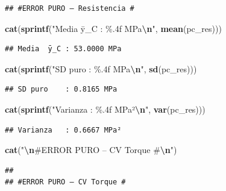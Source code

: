 \documentclass[
]{article}
\newenvironment{Shaded}{\begin{snugshade}}{\end{snugshade}}
\newcommand{\FunctionTok}[1]{\textcolor[rgb]{0.13,0.29,0.53}{\textbf{#1}}}
\newcommand{\NormalTok}[1]{#1}
\newcommand{\SpecialCharTok}[1]{\textcolor[rgb]{0.81,0.36,0.00}{\textbf{#1}}}
\newcommand{\StringTok}[1]{\textcolor[rgb]{0.31,0.60,0.02}{#1}}
\begin{document}
\begin{verbatim}
## #ERROR PURO – Resistencia #
\end{verbatim}

\begin{Shaded}
\begin{Highlighting}[]
\FunctionTok{cat}\NormalTok{(}\FunctionTok{sprintf}\NormalTok{(}\StringTok{"Media  ȳ\_C : \%.4f MPa}\SpecialCharTok{\textbackslash{}n}\StringTok{"}\NormalTok{,  }\FunctionTok{mean}\NormalTok{(pc\_res)))}
\end{Highlighting}
\end{Shaded}

\begin{verbatim}
## Media  ȳ_C : 53.0000 MPa
\end{verbatim}

\begin{Shaded}
\begin{Highlighting}[]
\FunctionTok{cat}\NormalTok{(}\FunctionTok{sprintf}\NormalTok{(}\StringTok{"SD puro    : \%.4f MPa}\SpecialCharTok{\textbackslash{}n}\StringTok{"}\NormalTok{,  }\FunctionTok{sd}\NormalTok{(pc\_res)))}
\end{Highlighting}
\end{Shaded}

\begin{verbatim}
## SD puro    : 0.8165 MPa
\end{verbatim}

\begin{Shaded}
\begin{Highlighting}[]
\FunctionTok{cat}\NormalTok{(}\FunctionTok{sprintf}\NormalTok{(}\StringTok{"Varianza   : \%.4f MPa²}\SpecialCharTok{\textbackslash{}n}\StringTok{"}\NormalTok{, }\FunctionTok{var}\NormalTok{(pc\_res)))}
\end{Highlighting}
\end{Shaded}

\begin{verbatim}
## Varianza   : 0.6667 MPa²
\end{verbatim}

\begin{Shaded}
\begin{Highlighting}[]
\FunctionTok{cat}\NormalTok{(}\StringTok{"}\SpecialCharTok{\textbackslash{}n}\StringTok{\#ERROR PURO – CV Torque \#}\SpecialCharTok{\textbackslash{}n}\StringTok{"}\NormalTok{)}
\end{Highlighting}
\end{Shaded}

\begin{verbatim}
## 
## #ERROR PURO – CV Torque #
\end{verbatim}
\end{document}
